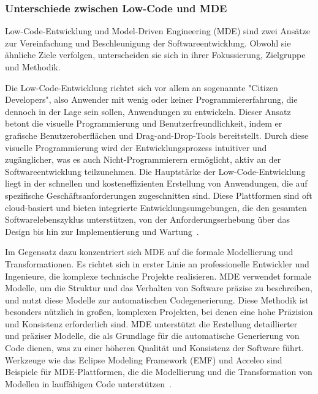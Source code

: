\subsubsection{Unterschiede zwischen Low-Code und MDE}
Low-Code-Entwicklung und Model-Driven Engineering (MDE) sind zwei Ansätze zur Vereinfachung und Beschleunigung der 
Softwareentwicklung. Obwohl sie ähnliche Ziele verfolgen, unterscheiden sie sich in ihrer Fokussierung, Zielgruppe und Methodik.

Die Low-Code-Entwicklung richtet sich vor allem an sogenannte "Citizen Developers", also Anwender mit wenig 
oder keiner Programmiererfahrung, die dennoch in der Lage sein sollen, Anwendungen zu entwickeln. Dieser Ansatz 
betont die visuelle Programmierung und Benutzerfreundlichkeit, indem er grafische Benutzeroberflächen und Drag-and-Drop-Tools 
bereitstellt. Durch diese visuelle Programmierung wird der Entwicklungsprozess intuitiver und zugänglicher, was es auch 
Nicht-Programmierern ermöglicht, aktiv an der Softwareentwicklung teilzunehmen. Die Hauptstärke der Low-Code-Entwicklung 
liegt in der schnellen und kosteneffizienten Erstellung von Anwendungen, die auf spezifische Geschäftsanforderungen 
zugeschnitten sind. Diese Plattformen sind oft cloud-basiert und bieten integrierte Entwicklungsumgebungen, die den 
gesamten Softwarelebenszyklus unterstützen, von der Anforderungserhebung über das Design bis hin zur Implementierung 
und Wartung~\cite{Cabot_2020}.

Im Gegensatz dazu konzentriert sich MDE auf die formale Modellierung und Transformationen. Es richtet sich in erster 
Linie an professionelle Entwickler und Ingenieure, die komplexe technische Projekte realisieren. MDE verwendet formale 
Modelle, um die Struktur und das Verhalten von Software präzise zu beschreiben, und nutzt diese Modelle zur automatischen 
Codegenerierung. Diese Methodik ist besonders nützlich in großen, komplexen Projekten, bei denen eine hohe Präzision und 
Konsistenz erforderlich sind. MDE unterstützt die Erstellung detaillierter und präziser Modelle, die als Grundlage für 
die automatische Generierung von Code dienen, was zu einer höheren Qualität und Konsistenz der Software führt. Werkzeuge 
wie das Eclipse Modeling Framework (EMF) und Acceleo sind Beispiele für MDE-Plattformen, die die Modellierung und die 
Transformation von Modellen in lauffähigen Code unterstützen~\cite{di2022low}.


